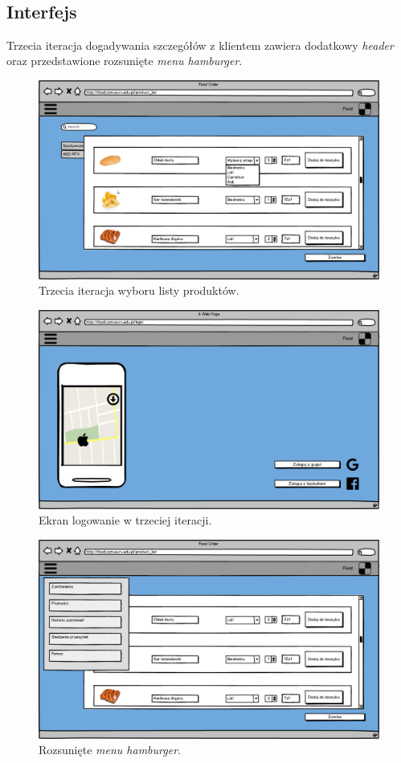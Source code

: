 \subsection{Interfejs}
Trzecia iteracja dogadywania szczegółów z klientem zawiera dodatkowy \textit{header} oraz przedstawione rozsunięte \textit{menu hamburger}.

\begin{figure}[H]
\centering
\includegraphics[width=15cm]{pictures/Lista_produktow_v3.png}
\caption{Trzecia iteracja wyboru listy produktów.}
\end{figure}

\begin{figure}[H]
\centering
\includegraphics[width=15cm]{pictures/Logowanie_v1.png}
\caption{Ekran logowanie w trzeciej iteracji.}
\end{figure}

\begin{figure}[H]
\centering
\includegraphics[width=15cm]{pictures/Navbar_v1.png}
\caption{Rozsunięte \textit{menu hamburger}.}
\end{figure}

